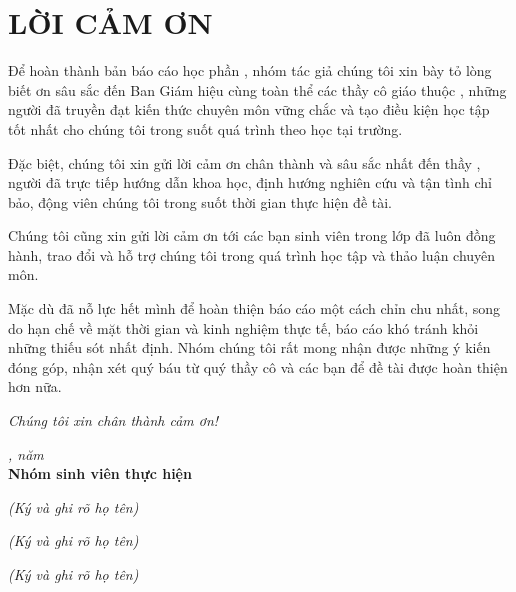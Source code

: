 
\chapter*{LỜI CẢM ƠN}

Để hoàn thành bản báo cáo học phần \textbf{\course}, nhóm tác giả chúng tôi xin bày tỏ lòng biết ơn sâu sắc đến Ban Giám hiệu \textbf{\university} cùng toàn thể các thầy cô giáo thuộc \textbf{\faculty}, những người đã truyền đạt kiến thức chuyên môn vững chắc và tạo điều kiện học tập tốt nhất cho chúng tôi trong suốt quá trình theo học tại trường.

Đặc biệt, chúng tôi xin gửi lời cảm ơn chân thành và sâu sắc nhất đến thầy \textbf{\supervisor}, người đã trực tiếp hướng dẫn khoa học, định hướng nghiên cứu và tận tình chỉ bảo, động viên chúng tôi trong suốt thời gian thực hiện đề tài.

Chúng tôi cũng xin gửi lời cảm ơn tới các bạn sinh viên trong lớp \textbf{\studentclass} đã luôn đồng hành, trao đổi và hỗ trợ chúng tôi trong quá trình học tập và thảo luận chuyên môn.

Mặc dù đã nỗ lực hết mình để hoàn thiện báo cáo một cách chỉn chu nhất, song do hạn chế về mặt thời gian và kinh nghiệm thực tế, báo cáo khó tránh khỏi những thiếu sót nhất định. Nhóm chúng tôi rất mong nhận được những ý kiến đóng góp, nhận xét quý báu từ quý thầy cô và các bạn để đề tài được hoàn thiện hơn nữa.

\textit{Chúng tôi xin chân thành cảm ơn!}

\vspace{1.2cm}
\begin{center}
    \textit{\location, năm \reportyear}\\[8pt]
    \textbf{Nhóm sinh viên thực hiện}
\end{center}

\vspace{0.8cm}
\noindent
\begin{minipage}[t]{0.32\textwidth}
    \centering
    \textit{(Ký và ghi rõ họ tên)}\\[55pt]
    \textbf{\leadername}
\end{minipage}
\hfill
\begin{minipage}[t]{0.32\textwidth}
    \centering
    \textit{(Ký và ghi rõ họ tên)}\\[55pt]
    \textbf{\membertwoname}
\end{minipage}
\hfill
\begin{minipage}[t]{0.32\textwidth}
    \centering
    \textit{(Ký và ghi rõ họ tên)}\\[55pt]
    \textbf{\memberthreename}
\end{minipage}

\clearpage
